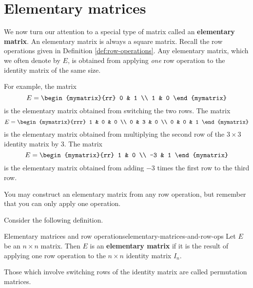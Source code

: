 
\section{Elementary matrices}

We now turn our attention to a special type of matrix called an \textbf{elementary matrix}. 
An elementary matrix is always a square matrix. Recall the row operations given in Definition \ref{def:row-operations}.
Any elementary matrix, which we often denote by $E$, is obtained from applying
{\em one\em} row operation to the identity matrix of the same size. 

For example, the matrix
\begin{equation*}
E = 
\begin{mymatrix}{rr}
0 & 1 \\
1 & 0
\end{mymatrix}
\end{equation*}
is the elementary matrix obtained from switching the two rows. 
The matrix 
\begin{equation*}
E = 
\begin{mymatrix}{rrr}
1 & 0 & 0 \\
0 & 3 & 0 \\
0 & 0 & 1
\end{mymatrix}
\end{equation*}
is the elementary matrix obtained from multiplying the second row of the $3 \times 3$ identity matrix
by $3$.
The matrix
\begin{equation*}
E = 
\begin{mymatrix}{rr}
1 & 0 \\
-3 & 1
\end{mymatrix}
\end{equation*}
is the elementary matrix obtained from adding $-3$ times the first row to the third row.

You may construct an elementary matrix from any row operation, but remember that you can only apply one operation.

Consider the following definition. 

\begin{definition}{Elementary matrices and row operations}{elementary-matrices-and-row-ops}
Let $E$ be an $n \times n$ matrix. Then $E$ is an \textbf{elementary matrix} 
if it is the result of applying one row operation to the $n \times n$ identity matrix $I_n$. 

Those which involve switching rows of the identity matrix are called
permutation matrices.
\end{definition}

